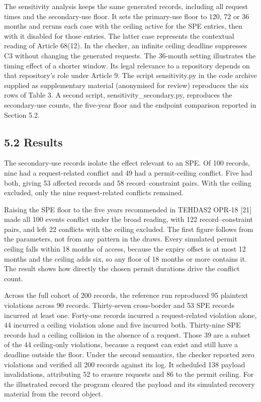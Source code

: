\documentclass[preprint,review,12pt]{elsarticle}
\begin{document}
The sensitivity analysis keeps the same generated records, including all
request times and the secondary-use floor. It sets the primary-use floor
to 120, 72 or 36 months and reruns each case with the ceiling active for
the SPE entries, then with it disabled for those entries. The latter
case represents the contextual reading of Article 68(12). In the
checker, an infinite ceiling deadline suppresses C3 without changing the
generated requests. The 36-month setting illustrates the timing effect
of a shorter window. Its legal relevance to a repository depends on that
repository's role under Article 9. The script sensitivity.py in the code
archive supplied as supplementary material (anonymised for review)
reproduces the six rows of Table 3. A second script,
sensitivity\_secondary.py, reproduces the secondary-use counts, the
five-year floor and the endpoint comparison reported in Section 5.2.

\hypertarget{results}{%
\subsection{5.2 Results}\label{results}}

The secondary-use records isolate the effect relevant to an SPE. Of 100
records, nine had a request-related conflict and 49 had a permit-ceiling
conflict. Five had both, giving 53 affected records and 58
record--constraint pairs. With the ceiling excluded, only the nine
request-related conflicts remained.

Raising the SPE floor to the five years recommended in TEHDAS2 OPR-18
{[}21{]} made all 100 events conflict under the broad reading, with 122
record--constraint pairs, and left 22 conflicts with the ceiling
excluded. The first figure follows from the parameters, not from any
pattern in the draws. Every simulated permit ceiling falls within 18
months of access, because the expiry offset is at most 12 months and the
ceiling adds six, so any floor of 18 months or more contains it. The
result shows how directly the chosen permit durations drive the conflict
count.

Across the full cohort of 200 records, the reference run reproduced 95
plaintext violations across 90 records. Thirty-seven cross-border and 53
SPE records incurred at least one. Forty-one records incurred a
request-related violation alone, 44 incurred a ceiling violation alone
and five incurred both. Thirty-nine SPE records had a ceiling collision
in the absence of a request. Those 39 are a subset of the 44
ceiling-only violations, because a request can exist and still have a
deadline outside the floor. Under the second semantics, the checker
reported zero violations and verified all 200 records against its log.
It scheduled 138 payload invalidations, attributing 52 to erasure
requests and 86 to the permit ceiling. For the illustrated record the
program cleared the payload and its simulated recovery material from the
record object.
\end{document}
